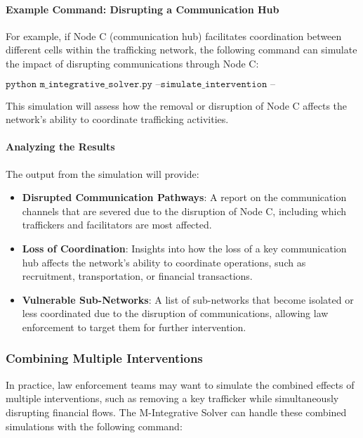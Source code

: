 \documentclass[%
 preprint, linenumbers,
 amsmath,amssymb,
 aps, physrev,
]{revtex4-2}
\begin{document}
\paragraph{Example Command: Disrupting a Communication Hub}

For example, if Node C (communication hub) facilitates coordination between different cells within the trafficking network, the following command can simulate the impact of disrupting communications through Node C:

\[
\texttt{python m\_integrative\_solver.py --simulate\_intervention --disrupt\_communication --node\_id 310}
\]

This simulation will assess how the removal or disruption of Node C affects the network’s ability to coordinate trafficking activities.

\paragraph{Analyzing the Results}

The output from the simulation will provide:
\begin{itemize}
    \item \textbf{Disrupted Communication Pathways}: A report on the communication channels that are severed due to the disruption of Node C, including which traffickers and facilitators are most affected.
    \item \textbf{Loss of Coordination}: Insights into how the loss of a key communication hub affects the network’s ability to coordinate operations, such as recruitment, transportation, or financial transactions.
    \item \textbf{Vulnerable Sub-Networks}: A list of sub-networks that become isolated or less coordinated due to the disruption of communications, allowing law enforcement to target them for further intervention.
\end{itemize}

\subsubsection{Combining Multiple Interventions}

In practice, law enforcement teams may want to simulate the combined effects of multiple interventions, such as removing a key trafficker while simultaneously disrupting financial flows. The M-Integrative Solver can handle these combined simulations with the following command:
\end{document}
